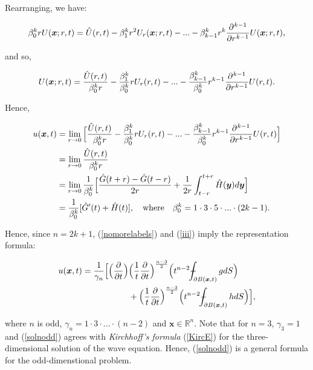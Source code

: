 \documentclass[a4paper, 12pt]{article}
\def\Xint#1{\mathchoice
{\XXint\displaystyle\textstyle{#1}}%
{\XXint\textstyle\scriptstyle{#1}}%
{\XXint\scriptstyle\scriptscriptstyle{#1}}%
{\XXint\scriptscriptstyle\scriptscriptstyle{#1}}%
\!\int}
\def\XXint#1#2#3{{\setbox0=\hbox{$#1{#2#3}{\int}$ }
\vcenter{\hbox{$#2#3$ }}\kern-.6\wd0}}
\def\dashint{\Xint-}
\numberwithin{equation}{section}
\begin{document}
Rearranging, we have:

\begin{equation*}
    \beta_0^k rU(\boldsymbol{x};r,t) = \hat{U}(r,t) - \beta_1^k r^2U_r(\boldsymbol{x};r,t) - ... -\beta_{k-1}^k r^k\diffp[k-1]{}{r}U(\boldsymbol{x};r,t),
\end{equation*}

and so,

\begin{equation*}
    U(\boldsymbol{x};r,t) = \frac{\hat{U}(r,t)}{\beta_0^k r} - \frac{\beta_1^k}{\beta_0^k} rU_r(r,t) - ... - \frac{\beta_{k-1}^k}{\beta_0^k} r^{k-1} \diffp[k-1]{}{r}U(r,t).
\end{equation*}

Hence,

\begin{equation*}
    \begin{aligned}
        u(\boldsymbol{x}, t)&=\lim_{r \rightarrow 0}\Big[\frac{\hat{U}(r,t)}{\beta_0^k r} - \frac{\beta_1^k}{\beta_0^k} rU_r(r,t) - ... - \frac{\beta_{k-1}^k}{\beta_0^k} r^{k-1} \diffp[k-1]{}{r}U(r,t)\Big]\\ 
        &=\lim_{r \rightarrow 0}\frac{\hat{U}(r,t)}{\beta_0^k r}\\ 
        &=\lim_{r \rightarrow 0} \frac{1}{\beta_0^k} \Big[\frac{\hat{G}(t+r)-\hat{G}(t-r)}{2r} + \frac{1}{2r}\int_{t-r}^{t+r} \hat{H}(\boldsymbol{y})d\boldsymbol{y}\Big]\\
        &= \frac{1}{\beta_0^k}[\hat{G}'(t)+\hat{H}(t)], \quad \textrm{where} \quad \beta_0^k = 1 \cdot 3 \cdot 5 \cdot ... \cdot (2k-1).
    \end{aligned}
\end{equation*}

Hence, since $n=2k+1$, (\ref{nomorelabels}) and (\ref{iii}) imply the
representation formula:

\begin{equation} \label{solnodd}
    \begin{split}
        u(\boldsymbol{x}, t)=\frac{1}{\gamma_n}\Big[\Big(\diffp[1]{}{t}\Big) & \Big(\frac{1}{t} \diffp[1]{}{t} \Big)^{\frac{n-3}{2}}\Big(t^{n-2} \dashint_{\partial B(\boldsymbol{x},t)}gdS \Big)\\
        &+ \Big(\frac{1}{t} \diffp[1]{}{t} \Big)^{\frac{n-3}{2}}\Big(t^{n-2} \dashint_{\partial B(\boldsymbol{x},t)}hdS \Big)\Big],
    \end{split}
\end{equation} 

where $n$ is odd, $\gamma_n=1 \cdot 3 \cdot ... \cdot (n-2)$ and
$\boldsymbol{x}\in \mathbb{R}^n$. Note that for $n=3$, $\gamma_3 = 1$ and
(\ref{solnodd}) agrees with \emph{Kirchhoff's formula} (\ref{KircE}) for the
three-dimensional solution of the wave equation. Hence, (\ref{solnodd}) is a
general formula for the odd-dimenstional problem.
\end{document}
